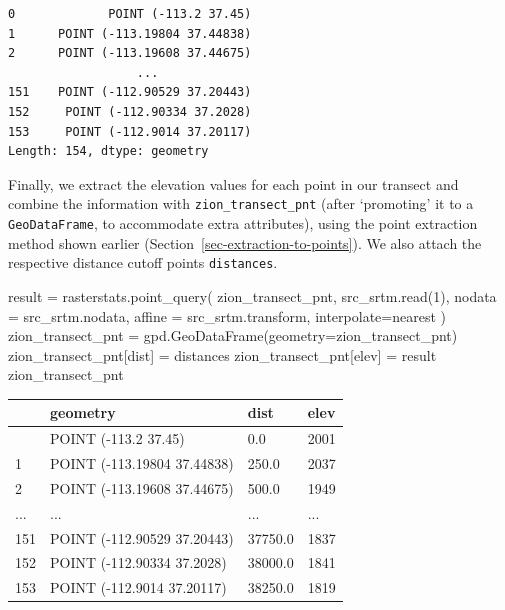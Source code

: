 \documentclass[
  letterpaper,
]{krantz}
\newenvironment{Shaded}{\begin{snugshade}}{\end{snugshade}}
\newcommand{\DecValTok}[1]{\textcolor[rgb]{0.68,0.00,0.00}{#1}}
\newcommand{\NormalTok}[1]{\textcolor[rgb]{0.00,0.23,0.31}{#1}}
\newcommand{\OperatorTok}[1]{\textcolor[rgb]{0.37,0.37,0.37}{#1}}
\newcommand{\StringTok}[1]{\textcolor[rgb]{0.13,0.47,0.30}{#1}}
\begin{document}
\begin{verbatim}
0             POINT (-113.2 37.45)
1      POINT (-113.19804 37.44838)
2      POINT (-113.19608 37.44675)
                  ...             
151    POINT (-112.90529 37.20443)
152     POINT (-112.90334 37.2028)
153     POINT (-112.9014 37.20117)
Length: 154, dtype: geometry
\end{verbatim}

Finally, we extract the elevation values for each point in our transect
and combine the information with \texttt{zion\_transect\_pnt} (after
`promoting' it to a \texttt{GeoDataFrame}, to accommodate extra
attributes), using the point extraction method shown earlier
(Section~\ref{sec-extraction-to-points}). We also attach the respective
distance cutoff points \texttt{distances}.

\begin{Shaded}
\begin{Highlighting}[]
\NormalTok{result }\OperatorTok{=}\NormalTok{ rasterstats.point\_query(}
\NormalTok{    zion\_transect\_pnt, }
\NormalTok{    src\_srtm.read(}\DecValTok{1}\NormalTok{), }
\NormalTok{    nodata }\OperatorTok{=}\NormalTok{ src\_srtm.nodata, }
\NormalTok{    affine }\OperatorTok{=}\NormalTok{ src\_srtm.transform,}
\NormalTok{    interpolate}\OperatorTok{=}\StringTok{\textquotesingle{}nearest\textquotesingle{}}
\NormalTok{)}
\NormalTok{zion\_transect\_pnt }\OperatorTok{=}\NormalTok{ gpd.GeoDataFrame(geometry}\OperatorTok{=}\NormalTok{zion\_transect\_pnt)}
\NormalTok{zion\_transect\_pnt[}\StringTok{\textquotesingle{}dist\textquotesingle{}}\NormalTok{] }\OperatorTok{=}\NormalTok{ distances}
\NormalTok{zion\_transect\_pnt[}\StringTok{\textquotesingle{}elev\textquotesingle{}}\NormalTok{] }\OperatorTok{=}\NormalTok{ result}
\NormalTok{zion\_transect\_pnt}
\end{Highlighting}
\end{Shaded}

\begin{longtable}[]{@{}llll@{}}
\toprule\noalign{}
& geometry & dist & elev \\
\midrule\noalign{}
\endhead
\bottomrule\noalign{}
\endlastfoot
0 & POINT (-113.2 37.45) & 0.0 & 2001 \\
1 & POINT (-113.19804 37.44838) & 250.0 & 2037 \\
2 & POINT (-113.19608 37.44675) & 500.0 & 1949 \\
... & ... & ... & ... \\
151 & POINT (-112.90529 37.20443) & 37750.0 & 1837 \\
152 & POINT (-112.90334 37.2028) & 38000.0 & 1841 \\
153 & POINT (-112.9014 37.20117) & 38250.0 & 1819 \\
\end{longtable}
\end{document}
